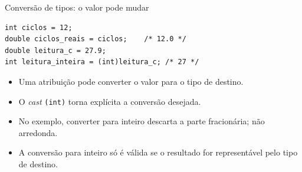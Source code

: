 \begin{frame}[fragile]{Conversão de tipos: o valor pode mudar}
\begin{lstlisting}
int ciclos = 12;
double ciclos_reais = ciclos;    /* 12.0 */
double leitura_c = 27.9;
int leitura_inteira = (int)leitura_c; /* 27 */
\end{lstlisting}
\begin{itemize}
\item Uma atribuição pode converter o valor para o tipo de destino.
\item O \textit{cast} \texttt{(int)} torna explícita a conversão desejada.
\item No exemplo, converter para inteiro descarta a parte fracionária; não arredonda.
\item A conversão para inteiro só é válida se o resultado for representável pelo tipo de destino.
\end{itemize}
\end{frame}
